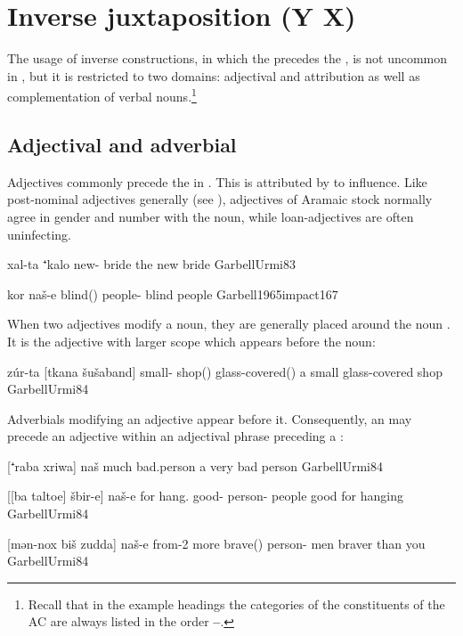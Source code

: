 \section{Inverse juxtaposition (Y X)} \label{ss:JUrm_inverse}

The usage of inverse constructions, in which the \secn precedes the \prim, is not  uncommon in \JUrm, but it is restricted to two domains: adjectival and  attribution as well as complementation of verbal nouns.\footnote{Recall that in the example headings the categories of the constituents of the AC are always listed in the order \textbf{\Prim--\Secn}.}

\subsection{Adjectival and adverbial \secns}

Adjectives commonly precede the  in \JUrm. This is attributed by \citet[172, \S 2.32.12 (2)]{Garbell1965impact} to \Azr influence.
Like post-nominal adjectives generally (see ), adjectives of Aramaic stock normally agree in gender and number with the \prim noun, while loan-adjectives are often uninfecting.

{xal-ta ⁺kalo}
{new-\fem{} bride}
{the new bride}
{GarbellUrmi}{83}

{kor naš-e}
{blind(\invar) people-\pl}
{blind people}
{Garbell1965impact}{167}

When two adjectives modify a noun, they are generally placed around the noun \citep[84]{GarbellUrmi}. It is the adjective with  larger scope which appears before the noun:

{zúr-ta [tkana šušaband]}
{small-\fem{} shop(\fem) glass-covered(\invar)}
{a small glass-covered shop}
{GarbellUrmi}{84}


Adverbials modifying an adjective appear before it. Consequently, an  may precede an adjective within an adjectival phrase preceding a :

{[⁺raba xriwa] naš}
{much bad.\masc person}
{a very bad person}
{GarbellUrmi}{84}

{[[ba\cb{} taltoe] šbir-e] naš-e}
{for\cb{} hang.\inf{} good-\pl{} person-\pl}
{people good for hanging}
{GarbellUrmi}{84}

{[mən-nox biš zudda] naš-e}
{from-2\masc{} more brave(\invar) person-\pl}
{men braver than you}
{GarbellUrmi}{84}

